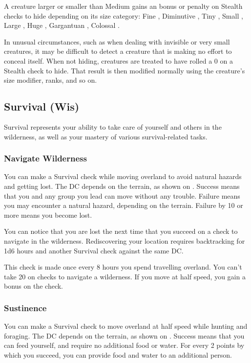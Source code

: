 A creature larger or smaller than Medium gains an bonus or penalty on Stealth checks to hide depending on its size category: Fine , Diminutive , Tiny , Small , Large , Huge , Gargantuan , Colossal .

 In unusual circumstances, such as when dealing with invisible or very small creatures, it may be difficult to detect a creature that is making no effort to conceal itself. When not hiding, creatures are treated to have rolled a 0 on a Stealth check to hide. That result is then modified normally using the creature's size modifier, ranks, and so on.

\subsection{Survival (Wis)}
Survival represents your ability to take care of yourself and others in the wilderness, as well as your mastery of various survival-related tasks. 

\subsubsection{Navigate Wilderness}
You can make a Survival check while moving overland to avoid natural hazards and getting lost. The DC depends on the terrain, as shown on . Success means that you and any group you lead can move without any trouble. Failure means you may encounter a natural hazard, depending on the terrain. Failure by 10 or more means you become lost.

You can notice that you are lost the next time that you succeed on a check to navigate in the wilderness. Rediscovering your location requires backtracking for 1d6 hours and another Survival check against the same DC.

This check is made once every 8 hours you spend travelling overland. You can't take 20 on checks to navigate a wilderness. If you move at half speed, you gain a  bonus on the check.

\subsubsection{Sustinence}
You can make a Survival check to move overland at half speed while hunting and foraging. The DC depends on the terrain, as shown on . Success means that you can feed yourself, and require no additional food or water. For every 2 points by which you succeed, you can provide food and water to an additional person.

